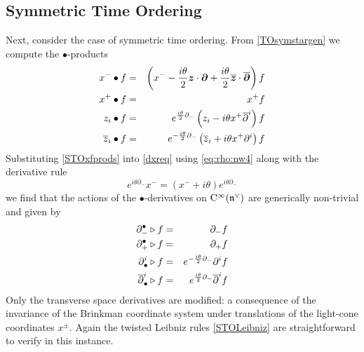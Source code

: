 \subsection{Symmetric Time Ordering}
\label{STOderiv}
Next, consider the case of symmetric time ordering. From \eqref{TOsymstargen} we
compute the $\bullet$-products
\begin{eqnarray}
  \label{STOxfprods}
  x^-\bullet f&=&\left(x^-- \frac{ i\theta}2  
{{\boldsymbol {z} }}\cdot{{\boldsymbol {\partial} }}+ \frac{ i\theta}2  \overline{{{\boldsymbol {z} }}}
\cdot\overline{{{\boldsymbol {\partial} }}} \right) f \\\nonumber
x^+\bullet f&=&x^+ f \\\nonumber
z_i\bullet f&=& e^{\frac{ i\theta}2 \partial_-} 
\left(z_i- i\theta x^+ \overline{\partial}^{ i}
\right) f \\\nonumber
\overline{z}_i\bullet f&=& e^{-\frac{ i\theta}2 \partial_-} 
\left( \overline{z}_i+ i\theta 
x^+ \partial^i\right) f
\end{eqnarray}
Substituting \eqref{STOxfprods} into \eqref{dxreq} using \eqref{eq:rho:nw4}
along with the derivative rule
\begin{equation}
  \label{derivrule1}
  e^{i\theta\partial_-}x^-=(x^-+i\theta)e^{i\theta\partial_-}
\end{equation}
we find that the actions of the $\bullet$-derivatives on ${\rm C}^\infty({\mathfrak n}^\vee)$
are generically non-trivial and given by
\begin{eqnarray}
  \label{STOderivs}
  \partial_-^\bullet\triangleright f&=&\partial_-f \\\nonumber
  \partial_+^\bullet\triangleright f&=&\partial_+f \\\nonumber
  \partial^i_\bullet\triangleright f&=& e^{-\frac{ i\theta}2 \partial_-} \partial^if \\\nonumber
  \overline{\partial}^{ i}_\bullet\triangleright f&=&
  e^{\frac{ i\theta}2 \partial_-} 
  \overline{\partial}^{ i}f
\end{eqnarray}
Only the transverse space derivatives are modified: a consequence of the
invariance of the Brinkman coordinate system under translations of the
light-cone coordinates $x^\pm$. Again the twisted Leibniz rules
\eqref{STOLeibniz} are straightforward to verify in this instance.

